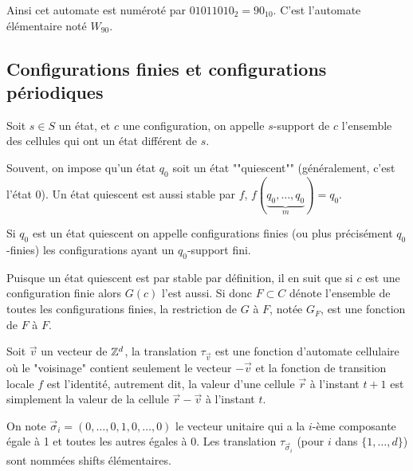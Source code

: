 Ainsi cet automate est numéroté par $01011010_2 = 90_{10}$. C'est l'automate élémentaire noté $W_{90}$.

\subsection{Configurations finies et configurations périodiques}

\begin{definition}
	Soit $s \in S$ un état, et $c$ une configuration, on appelle $s$-support de $c$ l'ensemble des cellules qui ont
	un état différent de $s$.
\end{definition}

\begin{notation}
	Souvent, on impose qu'un état $q_0$ soit un état ""quiescent"" (généralement, c'est l'état 0). Un état quiescent est aussi stable par
	$f$, \ie $f(\underbrace{q_0,\ldots, q_0}_m) = q_0$.
\end{notation}

\begin{definition}
	Si $q_0$ est un état quiescent on appelle configurations finies (ou plus précisément $q_0$-finies) les configurations ayant un $q_0$-support fini.
\end{definition}

Puisque un état quiescent est par stable par définition, il en suit que si $c$ est une configuration finie alors $G(c)$ l'est aussi. Si donc
$F \subset C$ dénote l'ensemble de toutes les configurations finies, la restriction de $G$ à $F$, notée $G_F$, est une fonction de $F$ à $F$.

\begin{definition}
	Soit $\vec v$ un vecteur de $\mathbb{Z}^d$, la translation $\tau_{\vec v}$ est une fonction d'automate cellulaire où le "voisinage" contient seulement
	le vecteur $-\vec v$ et la fonction de transition locale  $f$ est l'identité,
	autrement dit, la valeur d'une cellule $\vec r$ à l'instant $t+1$ est simplement la valeur de la cellule $\vec r - \vec v$ à l'instant $t$.
\end{definition}

\begin{definition}
	On note $\vec \sigma_i = (0,\ldots,0, 1, 0, \ldots, 0)$  le vecteur unitaire qui a la $i$-ème composante égale à 1 et toutes les autres égales
	à 0. Les translation   $\tau_{\vec \sigma_i}$ (pour $i$ dans $\{1, \ldots, d\}$) sont nommées shifts élémentaires.
\end{definition}

